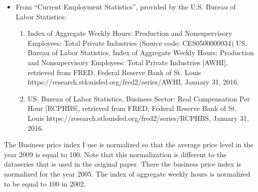 \begin{itemize}
\item From ``Current Employment Statistics'', provided by the U.S. Bureau of
  Labor Statistics:
  \begin{enumerate}
  \item Index of Aggregate Weekly Hours: Production and Nonsupervisory
    Employees: Total Private Industries (Source code: CES0500000034) US. Bureau
    of Labor Statistics, Index of Aggregate Weekly Hours: Production and
    Nonsupervisory Employees: Total Private Industries [AWHI], retrieved from
    FRED, Federal Reserve Bank of St. Louis
    https://research.stlouisfed.org/fred2/series/AWHI, January 31, 2016.
  \item US. Bureau of Labor Statistics, Business Sector: Real Compensation Per
    Hour [RCPHBS], retrieved from FRED, Federal Reserve Bank of St. Louis
    https://research.stlouisfed.org/fred2/series/RCPHBS, January 31, 2016.
  \end{enumerate}
\end{itemize}

The Business price index I use is normalized so that the average price level in
the year 2009 is equal to 100. Note that this normalization is different to the
dataseries that is used in the original paper. There the business price index
is normalized for the year 2005. The index of aggregate weekly hours is
normalized to be equal to 100 in 2002.
